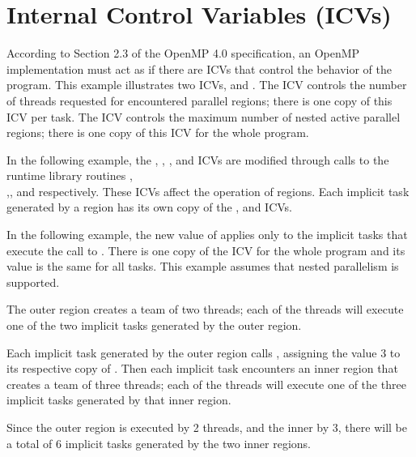 \pagebreak
\section{Internal Control Variables (ICVs)}
\label{sec:icv}

According to Section 2.3 of the OpenMP 4.0 specification, an OpenMP implementation must act as if there are ICVs that control 
the behavior of the program.  This example illustrates two ICVs,  
and . The  ICV controls the 
number of threads requested for encountered parallel regions; there is one copy 
of this ICV per task. The  ICV controls the maximum 
number of nested active parallel regions; there is one copy of this ICV for the 
whole program.

In the following example, the , , 
, and  ICVs are modified through calls to 
the runtime library routines ,\\ ,, and  respectively. These ICVs 
affect the operation of  regions. Each implicit task generated 
by a  region has its own copy of the , 
and  ICVs.

In the following example, the new value of  applies only to 
the implicit tasks that execute the call to . There 
is one copy of the  ICV for the whole program and 
its value is the same for all tasks. This example assumes that nested parallelism 
is supported.

The outer  region creates a team of two threads; each of the threads 
will execute one of the two implicit tasks generated by the outer  
region.

Each implicit task generated by the outer  region calls , 
assigning the value 3 to its respective copy of . Then each 
implicit task encounters an inner  region that creates a team 
of three threads; each of the threads will execute one of the three implicit tasks 
generated by that inner  region.

Since the outer  region is executed by 2 threads, and the inner 
by 3, there will be a total of 6 implicit tasks generated by the two inner  
regions.

